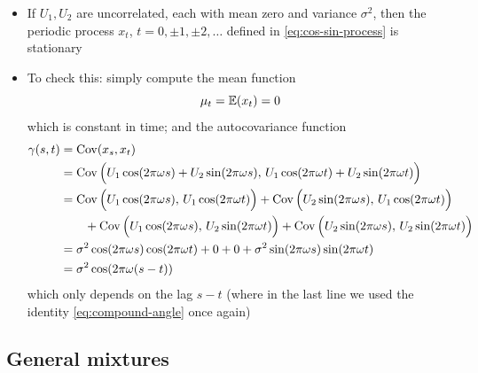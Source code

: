 \documentclass{article}
\begin{document}
\begin{itemize}
\item If $U_1,U_2$ are uncorrelated, each with mean zero and variance
  $\sigma^2$, then the periodic process $x_t$, $t = 0, \pm 1, \pm 2, \dots$
  defined in \eqref{eq:cos-sin-process} is stationary

\item To check this: simply compute the mean function
  \[
  \mu_t = \mathbb{E}(x_t) = 0
  \]
  which is constant in time; and the autocovariance function 
  \begin{align*}
  \gamma(s,t) &= \operatorname{Cov}(x_s, x_t) \\
  &= \operatorname{Cov}\Big( U_1 \cos(2\pi\omega s) + U_2 \sin(2\pi\omega s), \, 
    U_1 \cos(2\pi\omega t) + U_2 \sin(2\pi\omega t) \Big) \\
  &= \operatorname{Cov}\Big( U_1 \cos(2\pi\omega s), \, U_1 \cos(2\pi\omega t) \Big) +
    \operatorname{Cov}\Big( U_2 \sin(2\pi\omega s), \, U_1 \cos(2\pi\omega t) \Big) \\
  &\qquad + \operatorname{Cov}\Big( U_1 \cos(2\pi\omega s), \, U_2 \sin(2\pi\omega t) \Big) +  
     \operatorname{Cov}\Big( U_2 \sin(2\pi\omega s), \, U_2 \sin(2\pi\omega t) \Big) \\
  &=\sigma^2 \cos(2\pi\omega s) \cos(2\pi\omega t) + 0 + 0 + \sigma^2
    \sin(2\pi\omega s) \sin(2\pi\omega t) \\
  &= \sigma^2 \cos(2\pi\omega (s-t))
  \end{align*}
  which only depends on the lag $s-t$ (where in the last line we used the
  identity \eqref{eq:compound-angle} once again)
\end{itemize}

\subsection{General mixtures}
\end{document}
